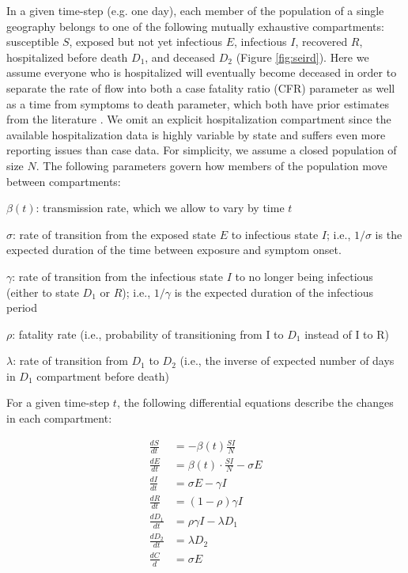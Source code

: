 \documentclass{umassthesis}          %
\newenvironment{packed_item}{
\begin{itemize}
 \setlength{\itemsep}{0pt}
  \setlength{\parskip}{0pt}
  \setlength{\parsep}{0pt}
}{\end{itemize}}
\begin{document}
In a given time-step (e.g. one day), each member of the population of a single geography belongs to one of the following mutually exhaustive compartments:
 susceptible $S$, exposed but not yet infectious $E$, infectious $I$, recovered $R$, hospitalized before death $D_1$, and deceased $D_2$ (Figure \ref{fig:seird}). Here we assume everyone who is hospitalized will eventually become deceased in order to separate the rate of flow into both a case fatality ratio (CFR) parameter as well as a time from symptoms to death parameter, which both have prior estimates from the literature \cite{russell2020estimating}. We omit an explicit hospitalization compartment since the available hospitalization data is highly variable by state and suffers even more reporting issues than case data.  For simplicity, we assume a closed population of size $N$. 
The following parameters govern how members of the population move between compartments:  
\begin{packed_item}
\item $\beta(t)$: transmission rate, which we allow to vary by time $t$
\item $\sigma$: rate of transition from the exposed state $E$ to infectious state $I$; i.e., $1/\sigma$ is the expected duration of the time between exposure and symptom onset. 
\item $\gamma$: rate of transition from  the infectious state $I$ to no longer being infectious (either to state $D_1$ or $R$); i.e., $1/\gamma$ is the expected duration of the infectious period
\item $\rho$: fatality rate (i.e., probability of transitioning from I to $D_1$ instead of I to R)
\item $\lambda$: rate of transition from $D_1$ to $D_2$ 
(i.e., the inverse of expected number of days in $D_1$ compartment before death) 
\end{packed_item}
For a given time-step $t$, the following differential equations describe the changes in each compartment:

\begin{equation}
\begin{aligned} 
\frac{dS}{dt} &= - \beta(t) \frac{SI}{N} \\
\frac{dE}{dt} &= \beta(t) \cdot \frac{SI}{N} - \sigma E \\
\frac{dI}{dt} &= \sigma E - \gamma I\\ 
\frac{dR}{dt} &= (1-\rho)\gamma I \\
\frac{dD_1}{dt} &= \rho \gamma I - \lambda D_1\\
\frac{dD_2}{dt} &= \lambda D_2\\
\frac{dC}{d} &= \sigma E
\end{aligned}
\end{equation}
\end{document}
